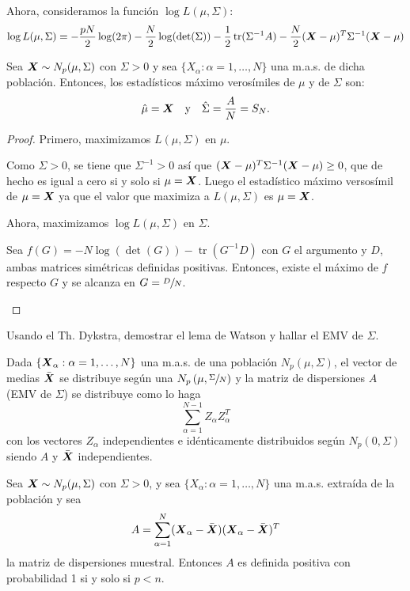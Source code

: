 Ahora, consideramos la función $\log L(\mu,\Sigma)$:
\[
\log L(\mu,\Sigma) = -\frac{pN}{2}\log(2\pi) - \frac{N}{2}\log(\det(\Sigma)) - \frac{1}{2}\operatorname{tr}(\Sigma^{-1}A) - \frac{N}{2}(\boldsymbol{X} - \mu)^T \Sigma^{-1}(\boldsymbol{X} - \mu)
\]

\begin{nprop}
  Sea $\boldsymbol{X} \sim N_p(\mu,\Sigma)$ con $\Sigma> 0$ y sea $\{ X_\alpha : \alpha = 1,\dots,N\}$ una m.a.s. de dicha población. Entonces, los estadísticos máximo verosímiles de $\mu$ y de $\Sigma$ son:
  \[
  \hat{\mu} = \boldsymbol{X} \quad \text{y} \quad \hat{\Sigma} = \frac{A}{N} = S_N.
  \]
\end{nprop}
\begin{proof}
  Primero, maximizamos $L(\mu,\Sigma)$ en $\mu$.

  Como $\Sigma > 0$, se tiene que $\Sigma^{-1}>0$ así que $(\boldsymbol{X} - \mu)^T \Sigma^{-1}(\boldsymbol{X} - \mu) \geq 0$, que de hecho es igual a cero si y solo si $\mu = \boldsymbol{X}$. Luego el estadístico máximo versosímil de $\mu = \boldsymbol{X}$ ya que el valor que maximiza a $L(\mu,\Sigma)$ es $\mu = \boldsymbol{X}$.

  Ahora, maximizamos $\log L(\mu,\Sigma)$ en $\Sigma$.

  \begin{lema}
    Sea $f(G) = -N \log(\det(G)) - \operatorname{tr}(G^{-1}D)$ con $G$ el argumento y $D$, ambas matrices simétricas definidas positivas. Entonces, existe el máximo de $f$ respecto $G$ y se alcanza en $G = \sfrac{D}{N}$.
  \end{lema}
\end{proof}
\begin{ejer}
Usando el Th. Dykstra, demostrar el lema de Watson y hallar el EMV de $\Sigma$.
\end{ejer}


\begin{nth}
  Dada $\{\boldsymbol{X}_\alpha: \alpha = 1,\dots,N\}$ una m.a.s. de una población $N_p(\mu,\Sigma)$, el vector de medias $\bar{\boldsymbol{X}}$ se distribuye según una $N_p\left(\mu,\sfrac{\Sigma}{N}\right)$ y la matriz de dispersiones $A$ (EMV de $\Sigma$) se distribuye como lo haga
  \[
\sum_{\alpha =1}^{N-1} Z_\alpha Z_\alpha^T
\]
con los vectores $Z_\alpha$ independientes e idénticamente distribuidos según $N_p(0,\Sigma)$ siendo $A$ y $\bar{\boldsymbol{X}}$ independientes.
\end{nth}

\begin{nth}
  Sea $\boldsymbol{X} \sim N_p(\mu,\Sigma)$ con $\Sigma > 0$, y sea $\{X_\alpha : \alpha = 1,\dots,N\}$ una m.a.s. extraída de la población y sea
  \[
A = \sum_{\alpha = 1}^N (\boldsymbol{X}_\alpha - \bar{\boldsymbol{X}})(\boldsymbol{X}_\alpha - \bar{\boldsymbol{X}})^T
\]
la matriz de dispersiones muestral. Entonces $A$ es definida positiva con probabilidad 1 si y solo si $p<n$.
\end{nth}

